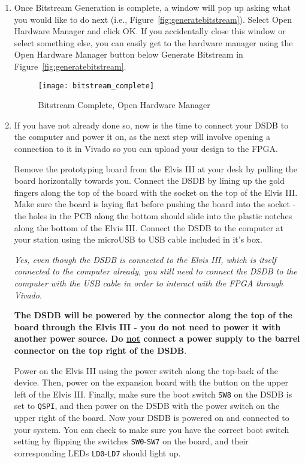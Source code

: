 \documentclass{article}
\begin{document}
\begin{enumerate}
\item Once Bitstream Generation is complete, a window will pop up asking what
you would like to do next (i.e., Figure~\ref{fig:generatebitstream}).  Select Open
Hardware Manager and click OK.  If you accidentally close this window or select
something else, you can easily get to the hardware manager using the Open
Hardware Manager button below Generate Bitstream in
Figure~\ref{fig:generatebitstream}.
\begin{figure}[h!]
	\centering
	\texttt{[image: bitstream\_complete]}
	\caption{Bitstream Complete, Open Hardware Manager}
	\label{fig:bitstreamcomplete}
\end{figure}

\item If you have not already done so, now is the time to connect your DSDB to
the computer and power it on, as the next step will involve opening a connection
to it in Vivado so you can upload your design to the FPGA.

Remove the prototyping board from the Elvis III at your desk by pulling the
board horizontally towards you.  Connect the DSDB by lining up the gold fingers
along the top of the board with the socket on the top of the Elvis III.  Make
sure the board is laying flat before pushing the board into the socket - the
holes in the PCB along the bottom should slide into the plastic notches along
the bottom of the Elvis III.  Connect the DSDB to the computer at your station
using the microUSB to USB cable included in it's box.

\emph{Yes, even though
the DSDB is connected to the Elvis III, which is itself connected to the
computer already, you still need to connect the DSDB to the computer with the
USB cable in order to interact with the FPGA through Vivado.}

\textbf{The DSDB will be powered by the connector along the top of the board
through the Elvis III - you do not need to power it with another power source.
Do \underline{not} connect a power supply to the barrel connector on the top right of the
DSDB}.

Power on the Elvis III using the power switch along the top-back of the device.
Then, power on the expansion board with the button on the upper left of the
Elvis III.  Finally, make sure the boot switch \verb|SW8| on the DSDB is set to
\verb|QSPI|, and then power on the DSDB with the power switch on the upper
right of the board.  Now your DSDB is powered on and connected to your system.
You can check to make sure you have the correct boot switch setting by flipping
the switches \verb|SW0|-\verb|SW7| on the board, and their corresponding LEDs
\verb|LD0|-\verb|LD7| should light up.


\end{enumerate}
\end{document}
